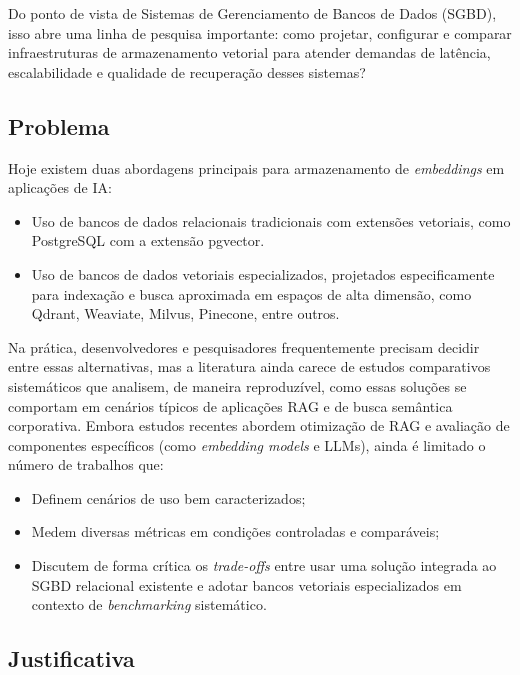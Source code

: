 Do ponto de vista de Sistemas de Gerenciamento de Bancos de Dados (SGBD), isso abre uma linha de pesquisa importante: como projetar, configurar e comparar infraestruturas de armazenamento vetorial para atender demandas de latência, escalabilidade e qualidade de recuperação desses sistemas?

\subsection{Problema}

Hoje existem duas abordagens principais para armazenamento de \textit{embeddings} em aplicações de IA:

\begin{itemize}
    \item Uso de bancos de dados relacionais tradicionais com extensões vetoriais, como PostgreSQL com a extensão pgvector.
    \item Uso de bancos de dados vetoriais especializados, projetados especificamente para indexação e busca aproximada em espaços de alta dimensão, como Qdrant, Weaviate, Milvus, Pinecone, entre outros.
\end{itemize}

Na prática, desenvolvedores e pesquisadores frequentemente precisam decidir entre essas alternativas, mas a literatura ainda carece de estudos comparativos sistemáticos que analisem, de maneira reproduzível, como essas soluções se comportam em cenários típicos de aplicações RAG e de busca semântica corporativa. Embora estudos recentes abordem otimização de RAG e avaliação de componentes específicos (como \textit{embedding models} e LLMs), ainda é limitado o número de trabalhos que:

\begin{itemize}
    \item Definem cenários de uso bem caracterizados;
    \item Medem diversas métricas em condições controladas e comparáveis;
    \item Discutem de forma crítica os \textit{trade-offs} entre usar uma solução integrada ao SGBD relacional existente e adotar bancos vetoriais especializados em contexto de \textit{benchmarking} sistemático.
\end{itemize}

\subsection{Justificativa}

